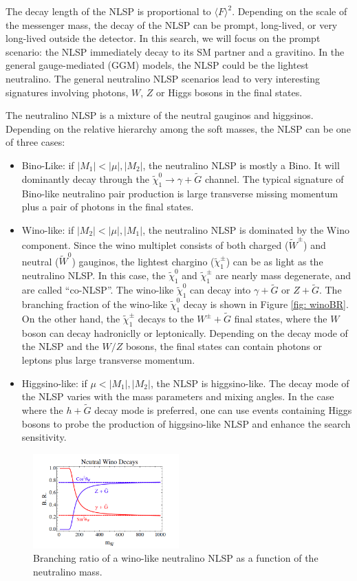 \documentclass[thesis.tex]{subfiles}
\begin{document}
The decay length of the NLSP is proportional to $\langle F \rangle^2$. 
Depending on the scale of the messenger mass, the decay of the NLSP can be prompt, long-lived, or very long-lived outside the detector. 
In this search, we will focus on the prompt scenario: the NLSP immediately decay to its SM partner and a gravitino. 
In the general gauge-mediated (GGM) models, the NLSP could be the lightest neutralino. 
The general neutralino NLSP scenarios lead to very interesting signatures involving photons, $W$, $Z$ or Higgs bosons in the final states. 

The neutralino NLSP is a mixture of the neutral gauginos and higgsinos. 
Depending on the relative hierarchy among the soft masses, the NLSP can be one of three cases:
\begin{itemize}
	\item Bino-Like: if $|M_1| < |\mu|,|M_2|$, the neutralino NLSP is mostly a Bino. It will dominantly decay through the $\tilde{\chi}_1^0 \rightarrow \gamma + \tilde{G}$ channel. 
	         The typical signature of Bino-like neutralino pair production is large transverse missing momentum plus a pair of photons in the final states.  
	\item Wino-like: if $|M_2| < |\mu|, |M_1|$, the neutralino NLSP is dominated by the Wino component. 
		Since the wino multiplet consists of both charged ($\tilde{W}^\pm$) and neutral ($\tilde{W}^0$) gauginos, the lightest chargino ($\tilde{\chi}_1^\pm$) can be as light as the neutralino NLSP. 
		In this case, the $\tilde{\chi}_1^0$ and $\tilde{\chi}_1^\pm$ are nearly mass degenerate, and are called ``co-NLSP''. 
		The wino-like $\tilde{\chi}_1^0$ can decay into $\gamma + \tilde{G}$ or $Z + \tilde{G}$. 
		The branching fraction of the wino-like $\tilde{\chi}_1^0$ decay is shown in Figure \ref{fig: winoBR}. 
		On the other hand, the $\tilde{\chi}_1^\pm$ decays to the $W^\pm+ \tilde{G}$ final states, where the $W$ boson can decay hadroniclly or leptonically. 
		Depending on the decay mode of the NLSP and the $W/Z$ bosons, the final states can contain photons or leptons plus large transverse momentum. 
	\item Higgsino-like: if $\mu < |M_1|, |M_2|$, the NLSP is higgsino-like. The decay mode of the NLSP varies with the mass parameters and mixing angles. In the case where the $h + \tilde{G}$ decay mode is preferred, one can use events containing Higgs bosons to probe the production of higgsino-like NLSP and enhance the search sensitivity. 
\end{itemize}
	\begin{figure}[!htb]
		\centering
		\includegraphics[width=0.5\textwidth]{plot/winoBR.png}
		\caption{Branching ratio of a wino-like neutralino NLSP as a function of the neutralino mass.}
		\label{fig:winoBR}
	\end{figure}
\end{document}
